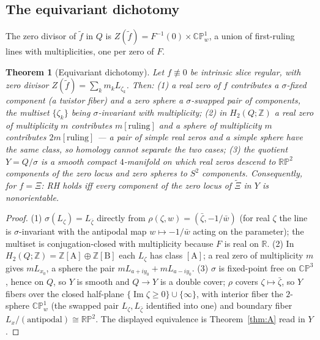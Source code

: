 \documentclass[11pt]{amsart}
\theoremstyle{plain}
\newtheorem{mainthm}{Theorem}
\theoremstyle{definition}
\theoremstyle{remark}
\newcommand{\RR}{\mathbb{R}}
\newcommand{\ZZ}{\mathbb{Z}}
\newcommand{\CP}{\mathbb{CP}}
\newcommand{\RP}{\mathbb{RP}}
\newcommand{\im}{\operatorname{Im}}
\begin{document}
\subsection*{The equivariant dichotomy}
The zero divisor of $\tilde f$ in $Q$ is $Z(\tilde f)=F^{-1}(0)\times\CP^1_w$, a union of
first-ruling lines with multiplicities, one per zero of $F$.

\begin{mainthm}[Equivariant dichotomy]\label{thm:C}
Let $f\not\equiv0$ be intrinsic slice regular, with zero divisor
$Z(\tilde f)=\sum_km_kL_{\zeta_k}$. Then:
\textup{(1)} a real zero of $f$ contributes a $\sigma$-\emph{fixed} component (a twistor fiber)
and a zero sphere a $\sigma$-\emph{swapped pair} of components, the multiset $\{\zeta_k\}$ being
$\sigma$-invariant with multiplicity;
\textup{(2)} in $H_2(Q;\ZZ)$ a real zero of multiplicity $m$ contributes $m[\mathrm{ruling}]$
and a sphere of multiplicity $m$ contributes $2m[\mathrm{ruling}]$ --- a pair of simple real
zeros and a simple sphere have the same class, so homology cannot separate the two cases;
\textup{(3)} the quotient $Y=Q/\sigma$ is a smooth compact $4$-manifold on which real zeros
descend to $\RP^2$ components of the zero locus and zero spheres to $S^2$ components.
Consequently, for $f=\Xi$:
\emph{RH holds iff every component of the zero locus of $\tilde\Xi$ in $Y$ is nonorientable.}
\end{mainthm}

\begin{proof}
(1) $\sigma(L_\zeta)=L_{\bar\zeta}$ directly from $\rho(\zeta,w)=(\bar\zeta,-1/\bar w)$ (for
real $\zeta$ the line is $\sigma$-invariant with the antipodal map $w\mapsto-1/\bar w$ acting on
the parameter); the multiset is conjugation-closed with multiplicity because $F$ is real on
$\RR$. (2) In $H_2(Q;\ZZ)=\ZZ[\mathrm{A}]\oplus\ZZ[\mathrm{B}]$ each $L_\zeta$ has class
$[\mathrm{A}]$; a real zero of multiplicity $m$ gives $mL_{x_0}$, a sphere the pair
$mL_{a+iy_0}+mL_{a-iy_0}$. (3) $\sigma$ is fixed-point free on $\CP^3$, hence on $Q$, so $Y$ is
smooth and $Q\to Y$ is a double cover; $\rho$ covers $\zeta\mapsto\bar\zeta$, so $Y$ fibers over
the closed half-plane $\{\im\zeta\ge0\}\cup\{\infty\}$, with interior fiber the $2$-sphere
$\CP^1_w$ (the swapped pair $L_\zeta,L_{\bar\zeta}$ identified into one) and boundary fiber
$L_x/(\text{antipodal})\cong\RP^2$. The displayed equivalence is Theorem~\ref{thm:A} read in
$Y$.
\end{proof}

\end{document}
